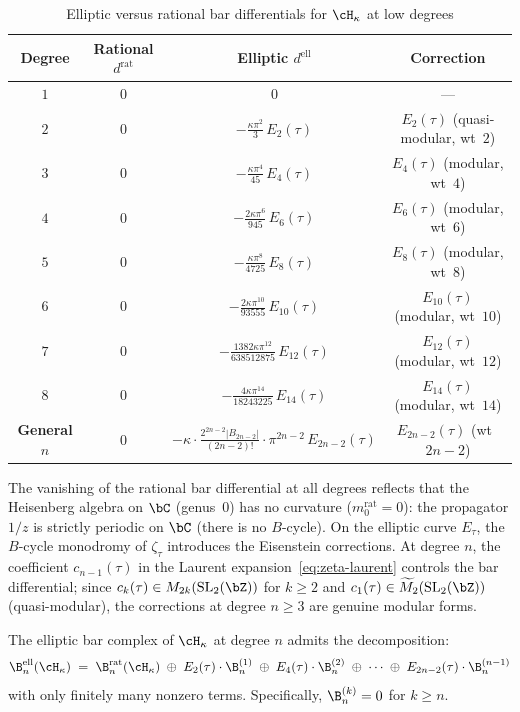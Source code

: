 \begin{table}[ht]
\centering
\caption{Elliptic versus rational bar differentials
for $\cH_\kappa$ at low degrees}
\label{tab:ell-vs-rat-bar}
\begin{tabular}{|c|c|c|c|}
\hline
\textbf{Degree} & \textbf{Rational $d^{\mathrm{rat}}$}
& \textbf{Elliptic $d^{\mathrm{ell}}$}
& \textbf{Correction} \\
\hline
$1$ & $0$ & $0$ & --- \\
\hline
$2$ & $0$ & $-\frac{\kappa\pi^2}{3}\,E_2(\tau)$
& $E_2(\tau)$ (quasi-modular, wt~$2$) \\
\hline
$3$ & $0$ & $-\frac{\kappa\pi^4}{45}\,E_4(\tau)$
& $E_4(\tau)$ (modular, wt~$4$) \\
\hline
$4$ & $0$ & $-\frac{2\kappa\pi^6}{945}\,E_6(\tau)$
& $E_6(\tau)$ (modular, wt~$6$) \\
\hline
$5$ & $0$ & $-\frac{\kappa\pi^8}{4725}\,E_8(\tau)$
& $E_8(\tau)$ (modular, wt~$8$) \\
\hline
$6$ & $0$ & $-\frac{2\kappa\pi^{10}}{93555}\,E_{10}(\tau)$
& $E_{10}(\tau)$ (modular, wt~$10$) \\
\hline
$7$ & $0$ & $-\frac{1382\kappa\pi^{12}}{638512875}\,E_{12}(\tau)$
& $E_{12}(\tau)$ (modular, wt~$12$) \\
\hline
$8$ & $0$ & $-\frac{4\kappa\pi^{14}}{18243225}\,E_{14}(\tau)$
& $E_{14}(\tau)$ (modular, wt~$14$) \\
\hline
\textbf{General $n$}
& $0$ & $-\kappa \cdot \tfrac{2^{2n-2}|B_{2n-2}|}{(2n-2)!}
 \cdot \pi^{2n-2}\,E_{2n-2}(\tau)$
& $E_{2n-2}(\tau)$ (wt~$2n{-}2$) \\
\hline
\end{tabular}
\end{table}

\noindent
The vanishing of the rational bar differential at all degrees
reflects that the Heisenberg algebra on $\bC$ (genus~$0$)
has no curvature ($m_0^{\mathrm{rat}} = 0$): the propagator
$1/z$ is strictly periodic on $\bC$ (there is no $B$-cycle).
On the elliptic curve $E_\tau$, the $B$-cycle monodromy of
$\zeta_\tau$ introduces the Eisenstein corrections. At degree $n$,
the coefficient $c_{n-1}(\tau)$ in the Laurent
expansion~\eqref{eq:zeta-laurent} controls the bar differential;
since $c_k(\tau) \in M_{2k}(\mathrm{SL}_2(\bZ))$ for $k \geq 2$
and $c_1(\tau) \in \widetilde{M}_2(\mathrm{SL}_2(\bZ))$ (quasi-modular),
the corrections at degree $n \geq 3$ are genuine modular forms.

\begin{proposition}\label{prop:ell-bar-decomposition}
The elliptic bar complex of $\cH_\kappa$ at degree $n$ admits
the decomposition:
\begin{equation}\label{eq:ell-bar-decomp}
\B^{\mathrm{ell}}_n(\cH_\kappa)
\;=\; \B^{\mathrm{rat}}_n(\cH_\kappa)
\;\oplus\; E_2(\tau) \cdot \B^{(1)}_n
\;\oplus\; E_4(\tau) \cdot \B^{(2)}_n
\;\oplus\; \cdots
\;\oplus\; E_{2n-2}(\tau) \cdot \B^{(n-1)}_n
\end{equation}
with only finitely many nonzero terms. Specifically,
$\B^{(k)}_n = 0$ for $k \geq n$.
\end{proposition}

